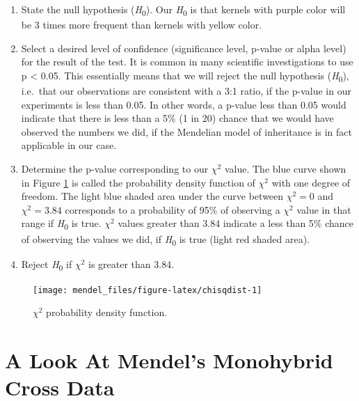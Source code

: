 \documentclass[]{book}
\providecommand{\tightlist}{%
  \setlength{\itemsep}{0pt}\setlength{\parskip}{0pt}}
\theoremstyle{definition}
\theoremstyle{definition}
\theoremstyle{definition}
\theoremstyle{remark}
\begin{document}
\begin{enumerate}
\def\labelenumi{\arabic{enumi}.}
\tightlist
\item
  State the null hypothesis (\emph{H}\textsubscript{0}). Our
  \emph{H}\textsubscript{0} is that kernels with purple color will be 3
  times more frequent than kernels with yellow color.
\item
  Select a desired level of confidence (significance level, p-value or
  alpha level) for the result of the test. It is common in many
  scientific investigations to use p \textless{} 0.05. This essentially
  means that we will reject the null hypothesis
  (\emph{H}\textsubscript{0}), i.e.~that our observations are consistent
  with a 3:1 ratio, if the p-value in our experiments is less than 0.05.
  In other words, a p-value less than 0.05 would indicate that there is
  less than a 5\% (1 in 20) chance that we would have observed the
  numbers we did, if the Mendelian model of inheritance is in fact
  applicable in our case.
\item
  Determine the p-value corresponding to our \(\chi^2\) value. The blue
  curve shown in Figure \ref{fig:chisqdist} is called the probability
  density function of \(\chi^2\) with one degree of freedom. The light
  blue shaded area under the curve between \(\chi^2=0\) and
  \(\chi^2=3.84\) corresponds to a probability of 95\% of observing a
  \(\chi^2\) value in that range if \emph{H}\textsubscript{0} is true.
  \(\chi^2\) values greater than 3.84 indicate a less than 5\% chance of
  observing the values we did, if \emph{H}\textsubscript{0} is true
  (light red shaded area).
\item
  Reject \emph{H}\textsubscript{0} if \(\chi^2\) is greater than 3.84.
\end{enumerate}



\begin{figure}

{\centering \texttt{[image: mendel\_files/figure-latex/chisqdist-1]} 

}

\caption{\(\chi^2\) probability density function.}\label{fig:chisqdist}
\end{figure}

\section{A Look At Mendel's Monohybrid Cross
Data}\label{a-look-at-mendels-monohybrid-cross-data}
\end{document}
